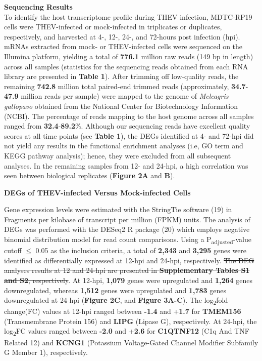 \documentclass[
]{article}
\begin{document}
\textbf{Sequencing Results}\\
To identify the host transcriptome profile during THEV infection,
MDTC-RP19 cells were THEV-infected or mock-infected in triplicates or
duplicates, respectively, and harvested at 4-, 12-, 24-, and 72-hours
post infection (hpi). mRNAs extracted from mock- or THEV-infected cells
were sequenced on the Illumina platform, yielding a total of
\textbf{776.1} million raw reads (149 bp in length) across all samples
(statistics for the sequencing reads obtained from each RNA library are
presented in \textbf{Table 1}). After trimming off low-quality reads,
the remaining \textbf{742.8} million total paired-end trimmed reads
(approximately, \textbf{34.7}-\textbf{47.9} million reads per sample)
were mapped to the genome of \emph{Meleagris gallopavo} obtained from
the National Center for Biotechnology Information (NCBI). The percentage
of reads mapping to the host genome across all samples ranged from
\textbf{32.4}-\textbf{89.2}\%. Although our sequencing reads have
excellent quality scores at all time points (see \textbf{Table 1}), the
DEGs identified at 4- and 72-hpi did not yield any results in the
functional enrichment analyses (i.e, GO term and KEGG pathway analysis);
hence, they were excluded from all subsequent analyses. In the remaining
samples from 12- and 24-hpi, a high correlation was seen between
biological replicates (\textbf{Figure 2A} and \textbf{B}).

\textbf{DEGs of THEV-infected Versus Mock-infected Cells}

Gene expression levels were estimated with the StringTie software (19)
in Fragments per kilobase of transcript per million (FPKM) units. The
analysis of DEGs was performed with the DESeq2 R package (20) which
employs negative binomial distribution model for read count comparisons.
Using a P\textsubscript{adjusted}-value cutoff \(\leq\) 0.05 as the
inclusion criteria, a total of \textbf{2,343} and \textbf{3,295} genes
were identified as differentially expressed at 12-hpi and 24-hpi,
respectively. \st{The DEG analyses results at 12 and 24-hpi are
presented in \textbf{Supplementary Tables S1 and S2}, respectively}. At
12-hpi, \textbf{1,079} genes were upregulated and \textbf{1,264} genes
downregulated, whereas \textbf{1,512} genes were upregulated and
\textbf{1,783} genes downregulated at 24-hpi (\textbf{Figure 2C}, and
\textbf{Figure 3A-C}). The log\textsubscript{2}fold-change(FC) values at
12-hpi ranged between \textbf{-1.4} and +\textbf{1.7} for
\textbf{TMEM156} (Transmembrane Protein 156) and \textbf{LIPG} (Lipase
G), respectively. At 24-hpi, the log\textsubscript{2}FC values ranged
between \textbf{-2.0} and +\textbf{2.6} for \textbf{C1QTNF12} (C1q And
TNF Related 12) and \textbf{KCNG1} (Potassium Voltage-Gated Channel
Modifier Subfamily G Member 1), respectively.
\end{document}
